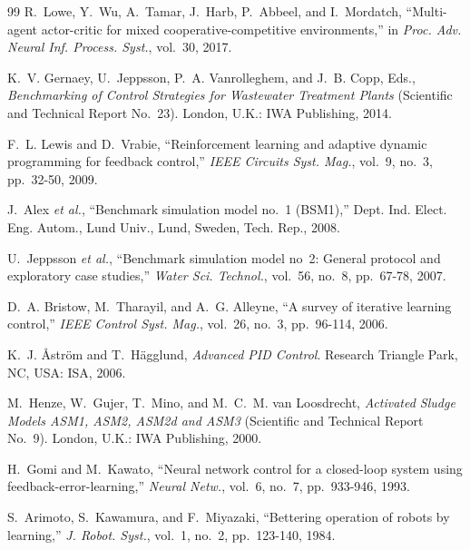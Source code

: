 \documentclass[journal]{IEEEtran}
\begin{document}
\begin{thebibliography}{99}
R.~Lowe, Y.~Wu, A.~Tamar, J.~Harb, P.~Abbeel, and I.~Mordatch, ``Multi-agent
actor-critic for mixed cooperative-competitive environments,'' in
\emph{Proc. Adv. Neural Inf. Process. Syst.}, vol.~30, 2017.

K.~V. Gernaey, U.~Jeppsson, P.~A. Vanrolleghem, and J.~B. Copp, Eds.,
\emph{Benchmarking of Control Strategies for Wastewater Treatment Plants}
(Scientific and Technical Report No.~23). London, U.K.: IWA Publishing,
2014.

F.~L. Lewis and D.~Vrabie, ``Reinforcement learning and adaptive dynamic
programming for feedback control,'' \emph{IEEE Circuits Syst. Mag.},
vol.~9, no.~3, pp.~32-50, 2009.

J.~Alex \emph{et al.}, ``Benchmark simulation model no.~1 (BSM1),'' Dept.
Ind. Elect. Eng. Autom., Lund Univ., Lund, Sweden, Tech. Rep., 2008.

U.~Jeppsson \emph{et al.}, ``Benchmark simulation model no~2: General
protocol and exploratory case studies,'' \emph{Water Sci. Technol.},
vol.~56, no.~8, pp.~67-78, 2007.

D.~A. Bristow, M.~Tharayil, and A.~G. Alleyne, ``A survey of iterative
learning control,'' \emph{IEEE Control Syst. Mag.}, vol.~26, no.~3,
pp.~96-114, 2006.

K.~J. {\AA}str{\"o}m and T.~H{\"a}gglund, \emph{Advanced PID Control}.
Research Triangle Park, NC, USA: ISA, 2006.

M.~Henze, W.~Gujer, T.~Mino, and M.~C.~M. van Loosdrecht, \emph{Activated
Sludge Models ASM1, ASM2, ASM2d and ASM3} (Scientific and Technical Report
No.~9). London, U.K.: IWA Publishing, 2000.

H.~Gomi and M.~Kawato, ``Neural network control for a closed-loop system
using feedback-error-learning,'' \emph{Neural Netw.}, vol.~6, no.~7,
pp.~933-946, 1993.

S.~Arimoto, S.~Kawamura, and F.~Miyazaki, ``Bettering operation of robots
by learning,'' \emph{J. Robot. Syst.}, vol.~1, no.~2, pp.~123-140, 1984.

\end{thebibliography}
\end{document}
